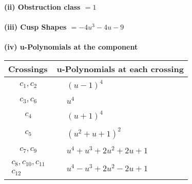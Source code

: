 \documentclass[1p]{elsarticle_modified}
\theoremstyle{definition}
\begin{document}
\flushleft \textbf{(ii) Obstruction class $= 1$}\\~\\
\flushleft \textbf{(iii) Cusp Shapes $= -4 u^3-4 u-9$}\\~\\
\newpage\renewcommand{\arraystretch}{1}
\flushleft \textbf{(iv) u-Polynomials at the component}\newline \\
\begin{tabular}{m{50pt}|m{274pt}}
Crossings & \hspace{64pt}u-Polynomials at each crossing \\
\hline $$\begin{aligned}c_{1},c_{2}\end{aligned}$$&$\begin{aligned}
&(u-1)^4
\end{aligned}$\\
\hline $$\begin{aligned}c_{3},c_{6}\end{aligned}$$&$\begin{aligned}
&u^4
\end{aligned}$\\
\hline $$\begin{aligned}c_{4}\end{aligned}$$&$\begin{aligned}
&(u+1)^4
\end{aligned}$\\
\hline $$\begin{aligned}c_{5}\end{aligned}$$&$\begin{aligned}
&(u^2+u+1)^2
\end{aligned}$\\
\hline $$\begin{aligned}c_{7},c_{9}\end{aligned}$$&$\begin{aligned}
&u^4+u^3+2 u^2+2 u+1
\end{aligned}$\\
\hline $$\begin{aligned}c_{8},c_{10},c_{11}\\c_{12}\end{aligned}$$&$\begin{aligned}
&u^4- u^3+2 u^2-2 u+1
\end{aligned}$\\
\hline
\end{tabular}\\~\\
\end{document}
